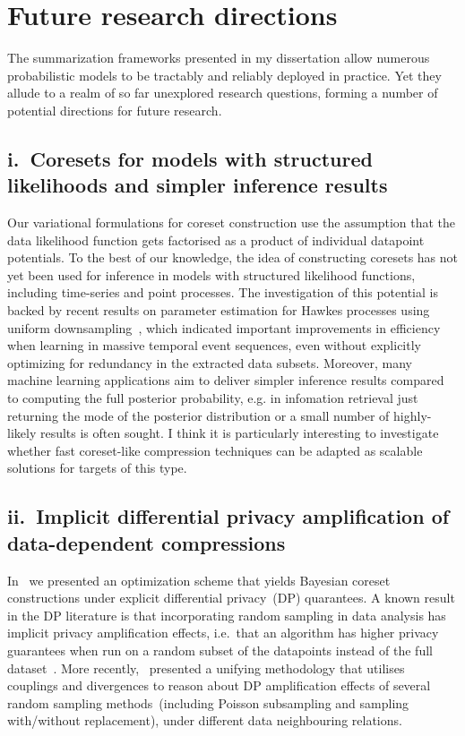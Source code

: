 \documentclass[11pt,a4paper,sans]{moderncv} %
\begin{document}
\section{Future research directions}
\label{sec:future-research-directions}
The summarization frameworks presented in my dissertation allow numerous probabilistic models to be tractably and reliably deployed in practice. Yet they allude to a realm of so far unexplored research questions, forming a number of potential directions for future research.

\subsection{i.~Coresets for models with structured likelihoods and simpler inference results}
\label{subsec:structure-liks}

Our variational formulations for coreset construction use the assumption that the data likelihood function gets factorised as a product of individual datapoint potentials. To the best of our knowledge, the idea of constructing coresets has not yet been used for inference in models with structured likelihood functions, including time-series and point processes. The investigation of this potential is backed by recent results on parameter estimation for Hawkes processes using uniform downsampling~\citep{li19}, which indicated important improvements in efficiency when learning in massive temporal event sequences, even without explicitly optimizing for redundancy in the extracted data subsets. Moreover, many machine learning applications aim to deliver simpler inference results compared to computing the full posterior probability, e.g. in infomation retrieval just returning the mode of the posterior distribution or a small number of highly-likely results is often sought. I think it is particularly interesting to investigate whether fast coreset-like compression techniques can be adapted as scalable solutions for targets of this type.

\subsection{ii.~Implicit differential privacy amplification of data-dependent compressions}
\label{subsec:implicit-dp-amplification}

In~\citep{psvi} we presented an optimization scheme that yields Bayesian coreset constructions under explicit differential privacy~(DP) quarantees. A known result in the DP literature is that incorporating random sampling in data analysis has implicit privacy amplification effects, i.e.~that an algorithm has higher privacy guarantees when run on a random subset of the datapoints instead of the full dataset~\citep{li12, beimel13, bassily14, abadi16}. More recently,~\citep{balle18} presented a unifying methodology that utilises couplings and divergences to reason about DP amplification effects of several random sampling methods~(including Poisson subsampling and sampling with/without replacement), under different data neighbouring relations.
\end{document}
